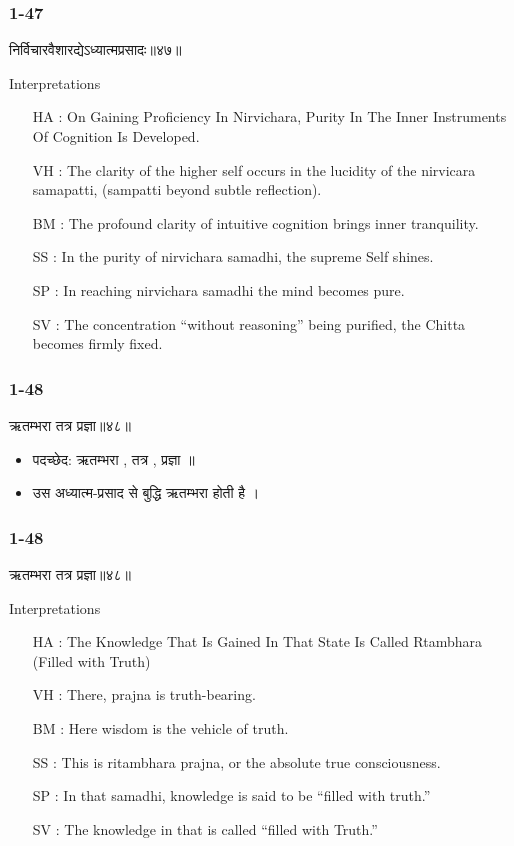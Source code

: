 \begin{frame}[fragile]\frametitle{1-47}
\begin{sanskrit}
निर्विचारवैशारद्येऽध्यात्मप्रसादः॥४७॥
\end{sanskrit}

Interpretations
\begin{itemize}
\item [HA]: On Gaining Proficiency In Nirvichara, Purity In The Inner Instruments Of Cognition Is Developed.
\item [VH]: The clarity of the higher self occurs in the lucidity of the nirvicara samapatti, (sampatti beyond subtle reflection).
\item [BM]: The profound clarity of intuitive cognition brings inner tranquility.
\item [SS]: In the purity of nirvichara samadhi, the supreme Self shines.
\item [SP]: In reaching nirvichara samadhi the mind becomes pure.
\item [SV]: The concentration “without reasoning” being purified, the Chitta becomes firmly fixed.
\end{itemize}
	
\end{frame}

\begin{frame}[fragile]\frametitle{1-48}
\begin{sanskrit}
ऋतम्भरा तत्र प्रज्ञा॥४८॥
\end{sanskrit}

\begin{itemize}
\item पदच्छेद: ऋतम्भरा , तत्र , प्रज्ञा ॥
\item उस अध्यात्म-प्रसाद से बुद्धि ऋतम्भरा होती है ।
\end{itemize}
	
\end{frame}

\begin{frame}[fragile]\frametitle{1-48}
\begin{sanskrit}
ऋतम्भरा तत्र प्रज्ञा॥४८॥
\end{sanskrit}

Interpretations
\begin{itemize}
\item [HA]: The Knowledge That Is Gained In That State Is Called Rtambhara (Filled with Truth)
\item [VH]: There, prajna is truth-bearing.
\item [BM]: Here wisdom is the vehicle of truth.
\item [SS]: This is ritambhara prajna, or the absolute true consciousness.
\item [SP]: In that samadhi, knowledge is said to be “filled with truth.”
\item [SV]: The knowledge in that is called “filled with Truth.” 
\end{itemize}
	
\end{frame}


